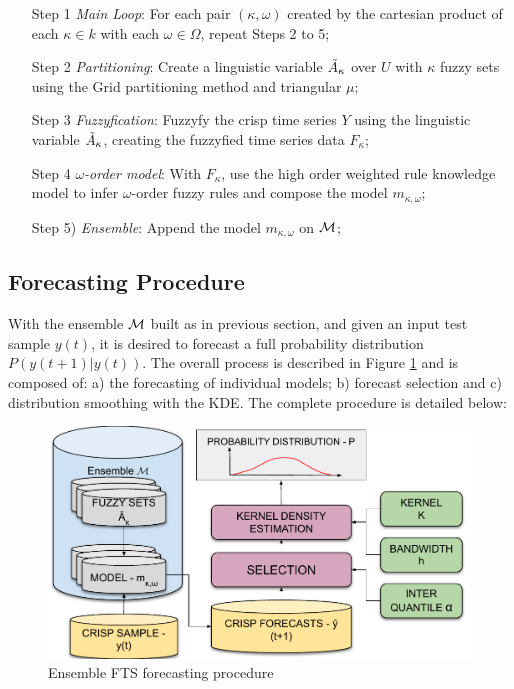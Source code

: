 \begin{enumerate}
\item[Step 1] \textit{Main Loop}: For each pair $(\kappa,\omega)$ created by the cartesian product of each $\kappa \in k$ with each $\omega \in \Omega$, repeat Steps 2 to 5;
\item[Step 2] \textit{Partitioning}: Create a linguistic variable $\tilde{A}_\kappa$ over $U$ with $\kappa$ fuzzy sets using the Grid partitioning method and triangular $\mu$;
\item[Step 3] \textit{Fuzzyfication}: Fuzzyfy the crisp time series $Y$ using the linguistic variable $\tilde{A}_\kappa$, creating the fuzzyfied time series data $F_\kappa$;
\item[Step 4] \textit{$\omega$-order model}: With $F_\kappa$, use the high order weighted rule knowledge model to infer  $\omega$-order fuzzy rules and compose the model $m_{\kappa,\omega}$;
\item[Step 5)] \textit{Ensemble}: Append the model $m_{\kappa,\omega}$ on $\mathcal{M}$;
\end{enumerate}

%
\subsection{Forecasting Procedure}
\label{sec:ensemblefts_forecasting}

With the ensemble $\mathcal{M}$ built as in previous section, and given an input test sample $y(t)$, it is desired to forecast a full probability distribution $P(y(t+1)|y(t))$. The overall process is described in Figure \ref{fig:ensemblefts_forecasting} and is composed of: a) the forecasting of individual models; b) forecast selection and c) distribution smoothing with the KDE. The complete procedure is detailed below:

\begin{figure}[htb]
\includegraphics[width=\textwidth]{figures/ensemblefts_forecasting.pdf}
\caption{Ensemble FTS forecasting procedure}
\label{fig:ensemblefts_forecasting}
\end{figure}

